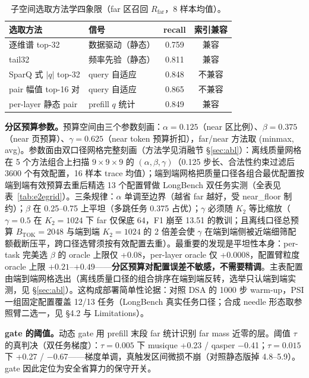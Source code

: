 \documentclass[11pt]{article}
\begin{document}
\begin{table}[h]\centering
\caption{子空间选取方法学四象限（far 区召回 $R_{\mathrm{far}}$，8 样本均值）。}
\label{tab:select}
\begin{tabular}{llcc}
\toprule
选取方法 & 信号 & recall & 索引兼容 \\
\midrule
逐维谱 top-32 & 数据驱动（静态） & 0.759 & 兼容 \\
tail32 & 频率先验（静态） & 0.811 & 兼容 \\
SparQ 式 $|q|$ top-32 & query 自适应 & 0.848 & 不兼容 \\
pair 幅值 top-16 对 & query 自适应 & 0.865 & 不兼容 \\
per-layer 静态 pair & prefill $q$ 统计 & 0.849 & 兼容 \\
\bottomrule
\end{tabular}
\end{table}

\textbf{分区预算参数。}预算空间由三个参数刻画：$\alpha{=}0.125$（near 区比例）、$\beta{=}0.375$（near 页预算）、$\gamma{=}0.625$（near token 预算折扣），far/near 方法取 (minmax, avg)。参数面由双口径网格完整刻画（方法学见消融节 \S\ref{sec:abl}）：离线质量网格在 5 个方法组合上扫描 $9\times9\times9$ 的 $(\alpha,\beta,\gamma)$（0.125 步长、合法性约束过滤后 3600 个有效配置，16 样本 trace 均值）；端到端网格把质量口径各组合最优配置按端到端有效预算去重后精选 13 个配置臂做 LongBench 双任务实测（全表见表~\ref{tab:e2egrid}）。三条规律：$\alpha$ 单调至边界（越省 far 越好，受 near\_floor 制约）；$\beta$ 在 0.25--0.75 上平坦（多跳任务 0.375 占优）；$\gamma$ 必须随 $K_2$ 等比缩放（$\gamma{=}0.5$ 在 $K_2{=}1024$ 下 far 仅保底 64，F1 崩至 13.51 的教训；且离线口径总预算 $B_{\mathrm{TOK}}{=}2048$ 与端到端 $K_2{=}1024$ 的 2 倍差会使 $\gamma$ 在端到端侧被近端细筛配额截断压平，跨口径选臂须按有效配置去重）。最重要的发现是平坦性本身：per-task 完美选 $\beta$ 的 oracle 上限仅 +0.08，per-layer oracle 仅 +0.0008，配置臂粒度 oracle 上限 $+0.21$--$+0.49$——\textbf{分区预算对配置误差不敏感，不需要精调}。主表配置由端到端网格选出（离线质量口径的组合排序在端到端反转，选举只认端到端实测，见 \S\ref{sec:abl}）。这构成部署简单性论据：对照 DSA 的 1000 步 warm-up，PSI 一组固定配置覆盖 12/13 任务（LongBench 真实任务口径；合成 needle 形态取参照臂二选一，见 \S4.2 与 Limitations）。

\textbf{gate 的阈值。}动态 gate 用 prefill 末段 far 统计识别 far mass 近零的层。阈值 $\tau$ 的真判决（双任务梯度）：$\tau{=}0.005$ 下 musique +0.23 / qasper $-$0.41；$\tau{=}0.015$ 下 +0.27 / $-$0.67——梯度单调，真触发区间微损不崩（对照静态版掉 4.8--5.9）。gate 因此定位为安全省算力的保守开关。
\end{document}

